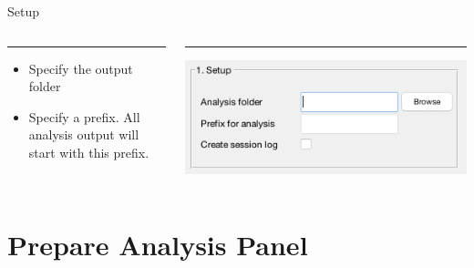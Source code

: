\documentclass[11pt]{beamer}
\begin{document}
\begin{frame}{Setup}
\begin{columns}[T] %
	\begin{column}{.48\textwidth}
		\color{red}\rule{\linewidth}{0pt}
		
		\begin{itemize}
\item Specify the output folder
\item Specify a prefix. All analysis output will start with this prefix.
\end{itemize}
		
	\end{column}%
	\hfill%
	\begin{column}{.51\textwidth}
		\color{blue}\rule{\linewidth}{0pt}
		\includegraphics[width=1.2\linewidth]{figs/subpanelsetup}
	\end{column}%
\end{columns}
\end{frame}


\section{Prepare Analysis Panel}
\end{document}
